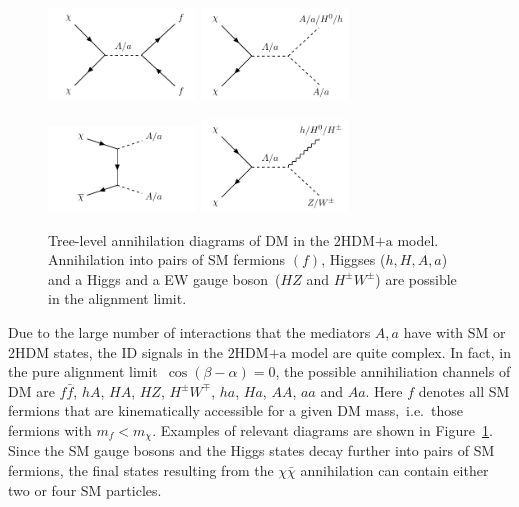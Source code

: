 \documentclass[a4paper, 11pt,notoc]{article}
\newcommand{\hdma}{\ensuremath{\textrm{2HDM+a}}\xspace}
\begin{document}
\begin{figure}[t!]
\centering
\includegraphics[width=0.35\textwidth]{graph_2hdm_relic_s_fermions.pdf} \qquad 
\includegraphics[width=0.35\textwidth]{graph_2hdm_relic_s_bosons.pdf} 

\vspace{5mm}

\includegraphics[width=0.35\textwidth]{graph_2hdm_relic_ss_bosons.pdf} \qquad 
\includegraphics[width=0.35\textwidth]{graph_2hdm_relic_s_vbosons.pdf}
\vspace{4mm}
\caption{Tree-level annihilation diagrams of DM in the \hdma model. Annihilation into pairs of SM fermions $(f)$, Higgses ($h, H,A,a$) and a Higgs and a EW gauge boson~($HZ$ and $H^\pm W^\pm$) are possible in the alignment limit.}
\label{fig:feyn_annihilation}
\end{figure}

Due to the large number of interactions that the mediators $A, a$ have with SM or 2HDM states, the ID signals in the \hdma model are quite complex. In fact, in the pure alignment limit~$\cos (\beta - \alpha) = 0$, the possible annihiliation channels of DM are $ f \bar f$, $hA$, $HA$, $HZ$,  $H^\pm W^\mp$, $ha$, $Ha$, $AA$, $aa$ and $Aa$.  Here $f$ denotes all SM fermions that are kinematically accessible for a given DM mass,~i.e.~those fermions with $m_f < m_\chi$. Examples of relevant diagrams are shown in Figure~\ref{fig:feyn_annihilation}. Since the SM gauge bosons and the Higgs states decay further into pairs of SM fermions, the final states resulting from the $\chi \bar \chi$ annihilation can contain either two or four SM particles. 
\end{document}
